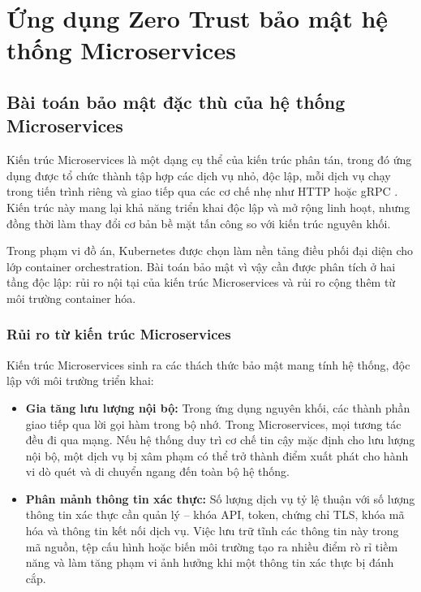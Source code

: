 \chapter{Ứng dụng Zero Trust bảo mật hệ thống Microservices}

\section{Bài toán bảo mật đặc thù của hệ thống Microservices}

Kiến trúc Microservices là một dạng cụ thể của kiến trúc phân tán, trong đó ứng dụng được tổ chức thành tập hợp các dịch vụ nhỏ, độc lập, mỗi dịch vụ chạy trong tiến trình riêng và giao tiếp qua các cơ chế nhẹ như HTTP hoặc gRPC \parencite{lewis_fowler_2014}. Kiến trúc này mang lại khả năng triển khai độc lập và mở rộng linh hoạt, nhưng đồng thời làm thay đổi cơ bản bề mặt tấn công so với kiến trúc nguyên khối.

Trong phạm vi đồ án, Kubernetes được chọn làm nền tảng điều phối đại diện cho lớp container orchestration. Bài toán bảo mật vì vậy cần được phân tích ở hai tầng độc lập: rủi ro nội tại của kiến trúc Microservices và rủi ro cộng thêm từ môi trường container hóa.

\subsection{Rủi ro từ kiến trúc Microservices}

Kiến trúc Microservices sinh ra các thách thức bảo mật mang tính hệ thống, độc lập với môi trường triển khai:

\begin{itemize}[itemsep=6pt, parsep=0pt]
    \item \textbf{Gia tăng lưu lượng nội bộ:}
    Trong ứng dụng nguyên khối, các thành phần giao tiếp qua lời gọi hàm trong bộ nhớ. Trong Microservices, mọi tương tác đều đi qua mạng. Nếu hệ thống duy trì cơ chế tin cậy mặc định cho lưu lượng nội bộ, một dịch vụ bị xâm phạm có thể trở thành điểm xuất phát cho hành vi dò quét và di chuyển ngang đến toàn bộ hệ thống.

    \item \textbf{Phân mảnh thông tin xác thực:}
    Số lượng dịch vụ tỷ lệ thuận với số lượng thông tin xác thực cần quản lý -- khóa API, token, chứng chỉ TLS, khóa mã hóa và thông tin kết nối dịch vụ. Việc lưu trữ tĩnh các thông tin này trong mã nguồn, tệp cấu hình hoặc biến môi trường tạo ra nhiều điểm rò rỉ tiềm năng và làm tăng phạm vi ảnh hưởng khi một thông tin xác thực bị đánh cắp.
\end{itemize}

